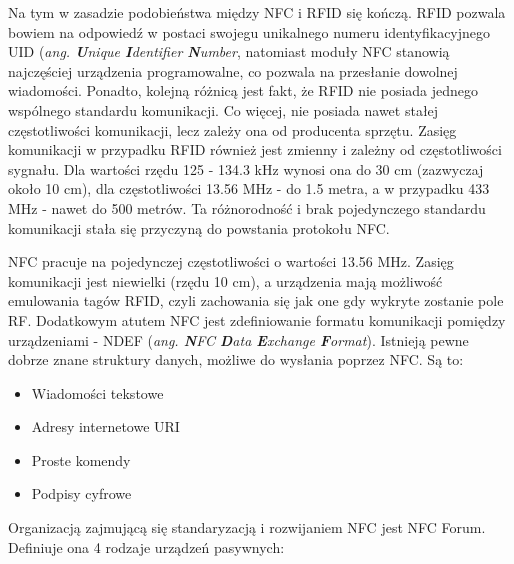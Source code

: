 Na tym w zasadzie podobieństwa między NFC i RFID się kończą. RFID pozwala bowiem na odpowiedź w postaci swojegu unikalnego numeru identyfikacyjnego UID (\textit{ang. \textbf{U}nique \textbf{I}dentifier \textbf{N}umber}, natomiast moduły NFC stanowią najczęściej urządzenia programowalne, co pozwala na przesłanie dowolnej wiadomości. Ponadto, kolejną różnicą jest fakt, że RFID nie posiada jednego wspólnego standardu komunikacji. Co więcej, nie posiada nawet stałej częstotliwości komunikacji, lecz zależy ona od producenta sprzętu.  Zasięg komunikacji w przypadku RFID również jest zmienny i zależny od częstotliwości sygnału. Dla wartości rzędu 125 - 134.3 kHz wynosi ona do 30 cm (zazwyczaj około 10 cm), dla częstotliwości 13.56 MHz - do 1.5 metra, a w przypadku 433 MHz - nawet do 500 metrów. Ta różnorodność i brak pojedynczego standardu komunikacji stała się przyczyną do powstania protokołu NFC.

NFC pracuje na pojedynczej częstotliwości o wartości 13.56 MHz. Zasięg komunikacji jest niewielki (rzędu 10 cm), a urządzenia mają możliwość emulowania tagów RFID, czyli zachowania się jak one gdy wykryte zostanie pole RF. Dodatkowym atutem NFC jest zdefiniowanie formatu komunikacji pomiędzy urządzeniami - NDEF (\textit{ang. \textbf{N}FC \textbf{D}ata \textbf{E}xchange \textbf{F}ormat}). Istnieją pewne dobrze znane struktury danych, możliwe do wysłania poprzez NFC. Są to:

\begin{itemize}
\item Wiadomości tekstowe
\item Adresy internetowe URI
\item Proste komendy
\item Podpisy cyfrowe
\end{itemize}

Organizacją zajmującą się standaryzacją i rozwijaniem NFC jest NFC Forum. Definiuje ona 4 rodzaje urządzeń pasywnych:

